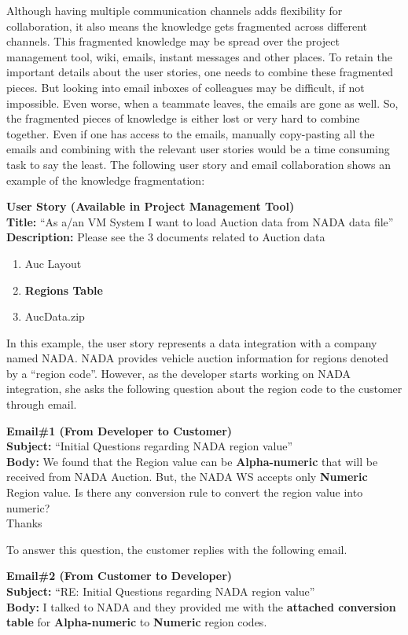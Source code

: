 Although having multiple communication channels adds flexibility for collaboration, it also means the knowledge gets fragmented across different channels. This fragmented knowledge may be spread over the project management tool, wiki, emails, instant messages and other places. To retain the important details about the user stories, one needs to combine these fragmented pieces. But looking into email inboxes of colleagues may be difficult, if not impossible. Even worse, when a teammate leaves, the emails are gone as well. So, the fragmented pieces of knowledge is either lost or very hard to combine together. Even if one has access to the emails, manually copy-pasting all the emails and combining with the relevant user stories would be a time consuming task to say the least. The following user story and email collaboration shows an example of the knowledge fragmentation:

\textbf{User Story (Available in Project Management Tool)}\\
\textbf{Title:} ``As a/an VM System I want to load Auction data from NADA data file''\\
\textbf{Description:} Please see the 3 documents related to Auction data
\begin{enumerate}
\item Auc Layout
\item \textbf{Regions Table}
\item AucData.zip
\end{enumerate}

In this example, the user story represents a data integration with a company named NADA. NADA provides vehicle auction information for regions denoted by a ``region code''. However, as the developer starts working on NADA integration, she asks the following question about the region code to the customer through email. 

\textbf{Email\#1 (From Developer to Customer)}\\
\textbf{Subject:} ``Initial Questions regarding NADA region value''\\
\textbf{Body:} We found that the Region value can be \textbf{Alpha-numeric} that will be received from NADA Auction. But, the NADA WS accepts only \textbf{Numeric} Region value. Is there any conversion rule to convert the region value into numeric? \\
Thanks

To answer this question, the customer replies with the following email.

\textbf{Email\#2 (From Customer to Developer)}\\
\textbf{Subject:} ``RE: Initial Questions regarding NADA region value''\\
\textbf{Body:} I talked to NADA and they provided me with the \textbf{attached conversion table} for \textbf{Alpha-numeric} to \textbf{Numeric} region codes.

